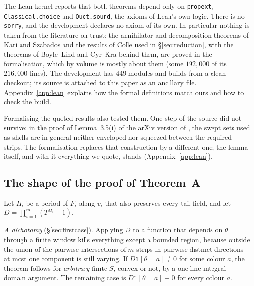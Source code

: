 \documentclass[11pt,reqno]{amsart}
\theoremstyle{plain}
\theoremstyle{definition}
\theoremstyle{remark}
\theoremstyle{plain}
\theoremstyle{remark}
\theoremstyle{definition}
\numberwithin{equation}{section}
\newcommand{\one}{\mathbb{1}}
\begin{document}
The Lean kernel reports that both theorems depend only on \texttt{propext},
\texttt{Classical.choice} and \texttt{Quot.sound}, the axioms of Lean's own
logic.  There is no \texttt{sorry}, and the development declares no axiom of its
own.  In particular nothing is taken from the literature on trust: the
annihilator and decomposition theorems of Kari and Szabados and the results of
Colle used in \S\ref{sec:reduction}, with the theorems of Boyle--Lind and
Cyr--Kra behind them, are proved in the formalisation, which by volume is
mostly about them (some $192{,}000$ of its $216{,}000$ lines).  The development
has $449$ modules and builds from a clean checkout; its source is attached to
this paper as an ancillary file.  Appendix~\ref{app:lean} explains how the
formal definitions match ours and how to check the build.

Formalising the quoted results also tested them.  One step of the source did not
survive: in the proof of Lemma~3.5(i) of the arXiv version of \cite{Colle23a},
the swept sets used as shells are in general neither enveloped nor squeezed
between the required strips.  The formalisation replaces that construction by a
different one; the lemma itself, and with it everything we quote, stands
(Appendix~\ref{app:lean}).

\subsection*{The shape of the proof of Theorem~A}

Let $H_i$ be a period of $F_i$ along $v_i$ that also preserves every tail field,
and let $D=\prod_{i=1}^m(T^{H_i}-1)$.

\emph{A dichotomy} (\S\ref{sec:firstcase}).  Applying $D$ to a function that
depends on $\theta$ through a finite window kills everything except a bounded
region, because outside the union of the pairwise intersections of $m$ strips in
pairwise distinct directions at most one component is still varying.  If
$D\one[\theta=a]\ne0$ for some colour $a$, the theorem follows for
\emph{arbitrary} finite $S$, convex or not, by a one-line integral-domain
argument.  The remaining case is $D\one[\theta=a]\equiv0$ for every colour $a$.
\end{document}
